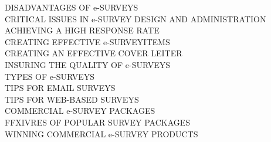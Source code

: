 \documentclass{book}
\begin{document}
DISADVANTAGES OF e-SURVEYS\quad{}\\
CRITICAL ISSUES IN e-SURVEY DESIGN AND ADMINISTRATION\quad{} \\
ACHIEVING A HIGH RESPONSE RATE\quad{} \\
CREATING EFFECTIVE e-SURVEYITEMS\quad{} \\
CREATING AN EFFECTIVE COVER LEITER\quad{} \\
INSURING THE QUALITY OF e-SURVEYS\quad{} \\
TYPES OF e-SURVEYS\quad{} \\
TIPS FOR EMAIL SURVEYS\quad{} \\
TIPS FOR WEB-BASED SURVEYS\quad{} \\
COMMERCIAL e-SURVEY PACKAGES\quad{} \\
FFXIVRES OF POPULAR SURVEY PACKAGES\quad{} \\
WINNING COMMERCIAL e-SURVEY PRODUCTS\quad{}
\end{document}
